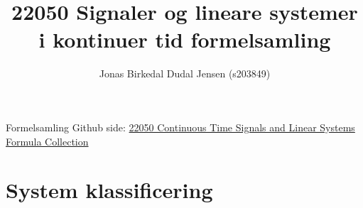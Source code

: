 \documentclass{article}
\title{22050 Signaler og lineare systemer i kontinuer tid formelsamling}
\date{}
\author{Jonas Birkedal Dudal Jensen (s203849)}
\begin{document}
	\maketitle
	\begin{center}
		Formelsamling Github side: \href{https://github.com/jondalnas/22050-Continuous-Time-Signals-and-Linear-Systems-Formula-Collection}{22050 Continuous Time Signals and Linear Systems Formula Collection}
	\end{center}

	\section{System klassificering}
	
\end{document}
